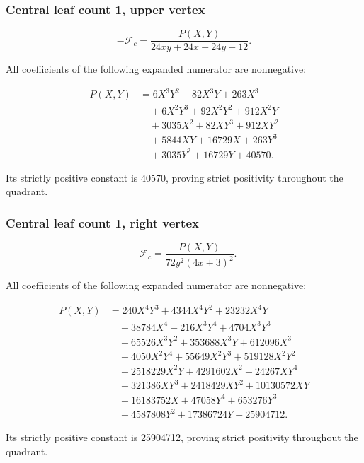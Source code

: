 \documentclass[11pt,reqno]{amsart}
\theoremstyle{plain}
\begin{document}
\par\noindent\begin{minipage}{\linewidth}
\subsubsection*{Central leaf count 1, upper vertex}\label{central-leaf-count-1-upper-vertex}

\[
-\mathcal F_c=\frac{P(X,Y)}{24 x y + 24 x + 24 y + 12}.
\]

All coefficients of the following expanded numerator are nonnegative:

\[
\begin{aligned}
P(X,Y)&=6 X^{3} Y^{2} + 82 X^{3} Y + 263 X^{3} \\
&\quad + 6 X^{2} Y^{3} + 92 X^{2} Y^{2} + 912 X^{2} Y \\
&\quad + 3035 X^{2} + 82 X Y^{3} + 912 X Y^{2} \\
&\quad + 5844 X Y + 16729 X + 263 Y^{3} \\
&\quad + 3035 Y^{2} + 16729 Y + 40570.
\end{aligned}
\]

Its strictly positive constant is 40570, proving strict positivity throughout the quadrant.
\end{minipage}\par\medskip

\par\noindent\begin{minipage}{\linewidth}
\subsubsection*{Central leaf count 1, right vertex}\label{central-leaf-count-1-right-vertex}

\[
-\mathcal F_c=\frac{P(X,Y)}{72 y^{2} \left(4 x + 3\right)^{2}}.
\]

All coefficients of the following expanded numerator are nonnegative:

\[
\begin{aligned}
P(X,Y)&=240 X^{4} Y^{3} + 4344 X^{4} Y^{2} + 23232 X^{4} Y \\
&\quad + 38784 X^{4} + 216 X^{3} Y^{4} + 4704 X^{3} Y^{3} \\
&\quad + 65526 X^{3} Y^{2} + 353688 X^{3} Y + 612096 X^{3} \\
&\quad + 4050 X^{2} Y^{4} + 55649 X^{2} Y^{3} + 519128 X^{2} Y^{2} \\
&\quad + 2518229 X^{2} Y + 4291602 X^{2} + 24267 X Y^{4} \\
&\quad + 321386 X Y^{3} + 2418429 X Y^{2} + 10130572 X Y \\
&\quad + 16183752 X + 47058 Y^{4} + 653276 Y^{3} \\
&\quad + 4587808 Y^{2} + 17386724 Y + 25904712.
\end{aligned}
\]

Its strictly positive constant is 25904712, proving strict positivity throughout the quadrant.
\end{minipage}\par\medskip
\end{document}
